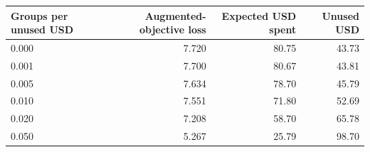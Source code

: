 \begin{tabular}{lrrr}
\toprule
Groups per unused USD & Augmented-objective loss & Expected USD spent & Unused USD \\
\midrule
0.000 & 7.720 & 80.75 & 43.73 \\
0.001 & 7.700 & 80.67 & 43.81 \\
0.005 & 7.634 & 78.70 & 45.79 \\
0.010 & 7.551 & 71.80 & 52.69 \\
0.020 & 7.208 & 58.70 & 65.78 \\
0.050 & 5.267 & 25.79 & 98.70 \\
\bottomrule
\end{tabular}
